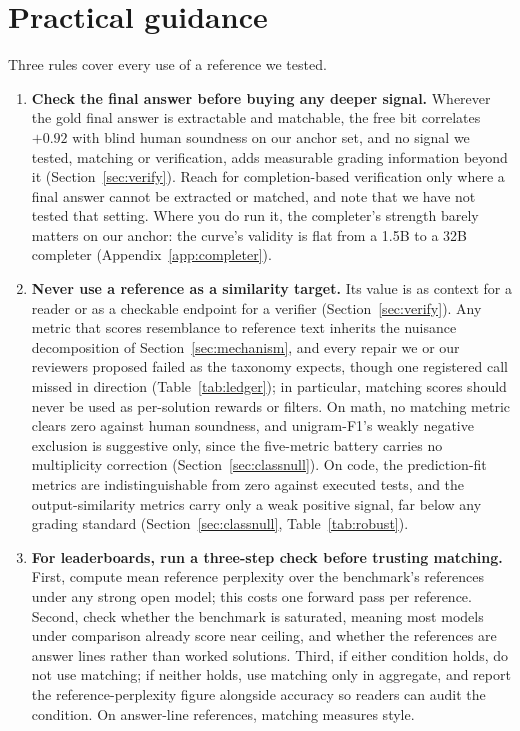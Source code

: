 \section{Practical guidance}
\label{sec:rules}

Three rules cover every use of a reference we tested.
\begin{enumerate}
\item \textbf{Check the final answer before buying any deeper signal.}
Wherever the gold final answer is extractable and matchable, the free bit correlates $+0.92$ with blind human soundness on our anchor set, and no signal we tested, matching or verification, adds measurable grading information beyond it (Section~\ref{sec:verify}).
Reach for completion-based verification only where a final answer cannot be extracted or matched, and note that we have not tested that setting.
Where you do run it, the completer's strength barely matters on our anchor: the curve's validity is flat from a 1.5B to a 32B completer (Appendix~\ref{app:completer}).
\item \textbf{Never use a reference as a similarity target.}
Its value is as context for a reader or as a checkable endpoint for a verifier (Section~\ref{sec:verify}).
Any metric that scores resemblance to reference text inherits the nuisance decomposition of Section~\ref{sec:mechanism}, and every repair we or our reviewers proposed failed as the taxonomy expects, though one registered call missed in direction (Table~\ref{tab:ledger}); in particular, matching scores should never be used as per-solution rewards or filters.
On math, no matching metric clears zero against human soundness, and unigram-F1's weakly negative exclusion is suggestive only, since the five-metric battery carries no multiplicity correction (Section~\ref{sec:classnull}).
On code, the prediction-fit metrics are indistinguishable from zero against executed tests, and the output-similarity metrics carry only a weak positive signal, far below any grading standard (Section~\ref{sec:classnull}, Table~\ref{tab:robust}).
\item \textbf{For leaderboards, run a three-step check before trusting matching.}
First, compute mean reference perplexity over the benchmark's references under any strong open model; this costs one forward pass per reference.
Second, check whether the benchmark is saturated, meaning most models under comparison already score near ceiling, and whether the references are answer lines rather than worked solutions.
Third, if either condition holds, do not use matching; if neither holds, use matching only in aggregate, and report the reference-perplexity figure alongside accuracy so readers can audit the condition.
On answer-line references, matching measures style.
\end{enumerate}
